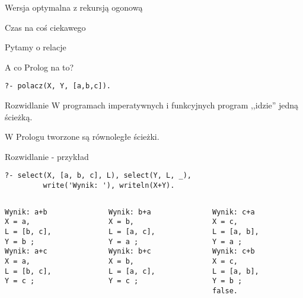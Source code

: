 \documentclass[blue]{beamer}
\begin{document}
\begin{frame}[fragile]{Wersja optymalna z rekursją ogonową}

\end{frame}
\begin{frame}[fragile]{Czas na coś ciekawego}


Pytamy o relacje

A co Prolog na to?

\begin{lstlisting}
?- polacz(X, Y, [a,b,c]).
\end{lstlisting}
\end{frame}
\begin{frame}[fragile]{Rozwidlanie}
W programach imperatywnych i funkcyjnych program ,,idzie'' jedną ścieżką.

W Prologu tworzone są równoległe ścieżki.

\end{frame}
\begin{frame}[fragile]{Rozwidlanie - przykład}
\begin{lstlisting}
?- select(X, [a, b, c], L), select(Y, L, _),
	     write('Wynik: '), writeln(X+Y).
\end{lstlisting}
\begin{columns}
\begin{column}{.33\linewidth}
\begin{lstlisting}
Wynik: a+b
X = a,
L = [b, c],
Y = b ;
Wynik: a+c
X = a,
L = [b, c],
Y = c ;

\end{lstlisting}
\end{column}
\begin{column}{.33\linewidth}
\begin{lstlisting}
Wynik: b+a
X = b,
L = [a, c],
Y = a ;
Wynik: b+c
X = b,
L = [a, c],
Y = c ;

\end{lstlisting}
\end{column}
\begin{column}{.33\linewidth}
\begin{lstlisting}
Wynik: c+a
X = c,
L = [a, b],
Y = a ;
Wynik: c+b
X = c,
L = [a, b],
Y = b ;
false.
\end{lstlisting}
\end{column}
\end{columns}
\end{frame}
\end{document}
